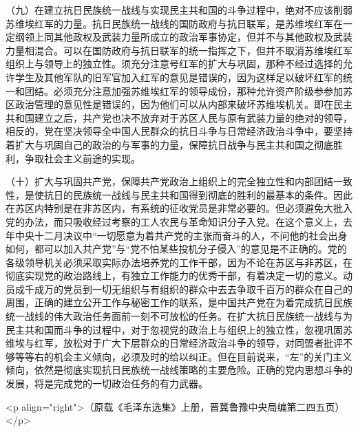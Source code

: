 （九）在建立抗日民族统一战线与实现民主共和国的斗争过程中，绝对不应该削弱苏维埃红军的力量。抗日民族统一战线的国防政府与抗日联军，是苏维埃红军在一定纲领上同其他政权及武装力量所成立的政治军事协定，但并不与其他政权及武装力量相混合。可以在国防政府与抗日联军的统一指挥之下，但并不取消苏维埃红军组织上与领导上的独立性。须充分注意号红军的扩大与巩固，那种不经过选择的允许学生及其他军队的旧军官加入红军的意见是错误的，因为这样足以破坏红军的统一和团结。必须充分注意加强苏维埃红军的领导成份，那种允许资产阶级参参加苏区政治管理的意见性是错误的，因为他们可以从内部来破坏苏维埃机关。即在民主共和国建立之后，共产党也决不放弃对于苏区人民与原有武装力量的绝对的领导，相反的，党在坚决领导全中国人民群众的抗日斗争与日常经济政治斗争中，要坚持着扩大与巩固自己的政治的与军事的力量，保障抗日战争与民主共和国之彻底胜利，争取社会主义前途的实现。

（十）扩大与巩固共产党，保障共产党政治上组织上的完全独立性和内部团结一致性，是使抗日的民族统一战线与民主共和国得到彻底的胜利的最基本的条件。因此在苏区内特别是在非苏区内，有系统的征收党员是非常必要的。但必须避免大批入党的办法，而只吸收经过考察的工人农民与革命知识分子入党。在这个意义上，去年中央十二月决议中“一切愿意为着共产党的主张而奋斗的人，不问他的社会出身如何，都可以加入共产党”与“党不怕某些投机分子侵入”的意见是不正确的。党的各级领导机关必须采取实际办法培养党的工作干部，因为不论在苏区与非苏区，在彻底实现党的政治路线上，有独立工作能力的优秀干部，有着决定一切的意义。动员成千成万的党员到一切无组织与有组织的群众中去去争取千百万的群众在自己的周围，正确的建立公开工作与秘密工作的联系，是中国共产党在为着完成抗日民族统一战线的伟大政治任务面前一刻不可放松的任务。在扩大抗日民族统一战线与为民主共和国而斗争的过程中，对于忽视党的政治上与组织上的独立性，忽视巩固苏维埃与红军，放松对于广大下层群众的日常经济政治斗争的领导，对同盟者批评不够等等右的机会主义倾向，必须及时的给以纠正。但在目前说来，“左”的关门主义倾向，依然是彻底实现抗日民族统一战线策略的主要危险。正确的党内思想斗争的发展，将是完成党的一切政治任务的有力武器。

<p align="right">（原载《毛泽东选集》上册，晋冀鲁豫中央局编第二四五页）</p>

